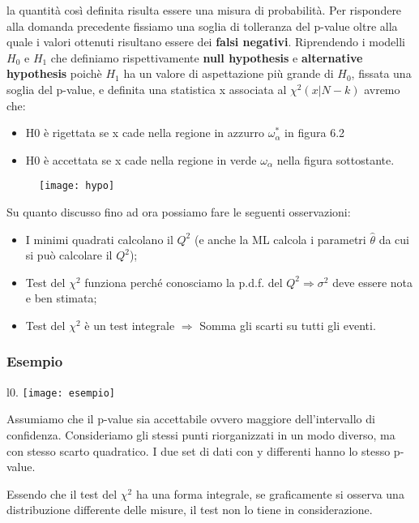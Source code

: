 \noindent la quantit\`{a} cos\`{i} definita risulta essere una misura di probabilit\`{a}. Per rispondere alla domanda precedente fissiamo una soglia di tolleranza del p-value oltre alla quale i valori ottenuti risultano essere dei \textbf{falsi negativi}. Riprendendo i modelli $H_0$ e $H_1$ che definiamo rispettivamente \textbf{null hypothesis} e \textbf{alternative hypothesis} poich\`{e} $H_1$ ha un valore di aspettazione pi\`{u} grande di $H_0$, fissata una soglia del p-value, e definita una statistica x associata al $\chi^2(x \vert N-k)$ avremo che:
\begin{itemize}
	\item H0 \`{e} rigettata se x cade nella regione in azzurro $\omega_\alpha^* $ in figura 6.2
	\item H0 \`{e} accettata se x cade nella regione in verde $\omega_\alpha$ nella figura sottostante.
\end{itemize}
\begin{figure}[ht]
\texttt{[image: hypo]}	
\centering
\end{figure}
Su quanto discusso fino ad ora possiamo fare le seguenti osservazioni:
\begin{itemize}
	\item I minimi quadrati calcolano il $Q^2$ (e anche la ML calcola i parametri $\hat{\theta}$ da cui si può calcolare il $Q^2$);
	\item Test del $\chi^2$ funziona perché conosciamo la p.d.f. del $Q^2 \Rightarrow \sigma^2$  deve essere nota e ben stimata;
	\item Test del $\chi^2$ è un test integrale $\Rightarrow$ Somma gli scarti su tutti gli eventi.
\end{itemize}

\subsubsection{Esempio}

\begin{wrapfigure}{l}{0.\textwidth}
\centering
\texttt{[image: esempio]}	
\end{wrapfigure}

Assumiamo che il p-value sia accettabile ovvero maggiore
dell'intervallo di confidenza. Consideriamo gli stessi punti 
riorganizzati in un modo diverso, ma con stesso scarto quadratico.
I due set di dati con y differenti hanno lo stesso p-value.

Essendo che il test del $\chi^2$ ha una forma integrale, se
graficamente si osserva una distribuzione differente delle
misure, il test non lo tiene in considerazione.

